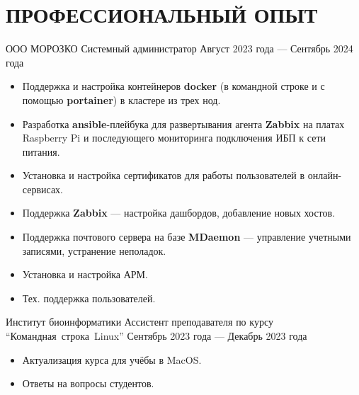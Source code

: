 \section{ПРОФЕССИОНАЛЬНЫЙ ОПЫТ}

    \job
        {ООО МОРОЗКО}
        {Системный администратор}
        {Август 2023 года --- Сентябрь 2024 года}

        \begin{itemize}
            \setlength\itemsep{-.5em}
            \item Поддержка и настройка контейнеров \textbf{docker} (в командной строке и с помощью \textbf{portainer}) в кластере из трех нод.
            \item Разработка \textbf{ansible}-плейбука для развертывания агента \textbf{Zabbix} на платах Raspberry Pi и последующего мониторинга подключения ИБП к сети питания.
            \item Установка и настройка сертификатов для работы пользователей в онлайн-сервисах.
            \item Поддержка \textbf{Zabbix} — настройка дашбордов, добавление новых хостов.
            \item Поддержка почтового сервера на базе \textbf{MDaemon} — управление учетными записями, устранение неполадок.
            \item Установка и настройка АРМ.
            \item Тех. поддержка пользователей.
        \end{itemize}

        \vspace{-0.5em}
    
    \job
        {Институт биоинформатики}
        {Ассистент преподавателя по курсу “\mbox{Командная}~строка~Linux”}
        {Сентябрь 2023 года — Декабрь 2023 года}

        \begin{itemize}
            \setlength\itemsep{-.5em}
            \item Актуализация курса для учёбы в MacOS.
            \item Ответы на вопросы студентов.
        \end{itemize}
